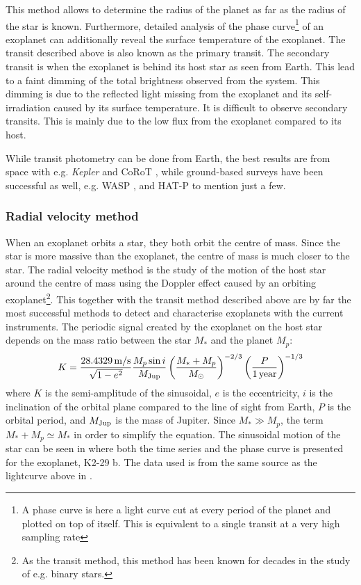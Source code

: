 This method allows to determine the radius of the planet as far as the radius of the star is known.
Furthermore, detailed analysis of the phase curve\footnote{A phase curve is here a light curve cut
at every period of the planet and plotted on top of itself. This is equivalent to a single transit
at a very high sampling rate} of an exoplanet can additionally reveal the surface temperature of the
exoplanet. The transit described above is also known as the primary transit. The secondary transit
is when the exoplanet is behind its host star as seen from Earth. This lead to a faint dimming of
the total brightness observed from the system. This dimming is due to the reflected light missing
from the exoplanet and its self-irradiation caused by its surface temperature. It is difficult to
observe secondary transits. This is mainly due to the low flux from the exoplanet compared to its
host.

While transit photometry can be done from Earth, the best results are from space with e.g.
\emph{Kepler} \citep{Borucki2010} and CoRoT \citep{Baglin2006}, while ground-based surveys have been
successful as well, e.g. WASP \citep{Pollacco2006}, and HAT-P \citep{Bakos2004} to mention just a
few.



\subsubsection{Radial velocity method}
\label{sec:rvmethod}

When an exoplanet orbits a star, they both orbit the centre of mass. Since the star is more massive
than the exoplanet, the centre of mass is much closer to the star. The radial velocity method is the
study of the motion of the host star around the centre of mass using the Doppler effect caused by an
orbiting exoplanet\footnote{As the transit method, this method has been known for decades in the
study of e.g. binary stars.}. This together with the transit method described above are by far the
most successful methods to detect and characterise exoplanets  with the current instruments. The
periodic signal created by the exoplanet on the host star depends on the mass ratio between the star
$M_\ast$ and the planet $M_p$:
\begin{align}
  K = \frac{\SI{28.4329}{m/s}}{\sqrt{1-e^2}} \frac{M_p\sin i}{M_\mathrm{Jup}} \left( \frac{M_\ast+M_p}{M_\odot} \right)^{-2/3} \left(\frac{P}{\SI{1}{year}}\right)^{-1/3}  \label{eq:rv}
\end{align}
where $K$ is the semi-amplitude of the sinusoidal, $e$ is the eccentricity, $i$ is the inclination
of the orbital plane compared to the line of sight from Earth, $P$ is the orbital period, and
$M_\mathrm{Jup}$ is the mass of Jupiter. Since $M_\ast \gg M_p$, the term $M_\ast+M_p\simeq M_\ast$ in order
to simplify the equation. The sinusoidal motion of the star can be seen in  where
both the time series and the phase curve is presented for the exoplanet, K2-29 b. The data used is
from the same source as the lightcurve above in .

